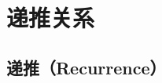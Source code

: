 \documentclass[12pt, openany, oneside]{book}
\begin{document}










\section{递推关系}

\subsection{递推（Recurrence）}
\end{document}
